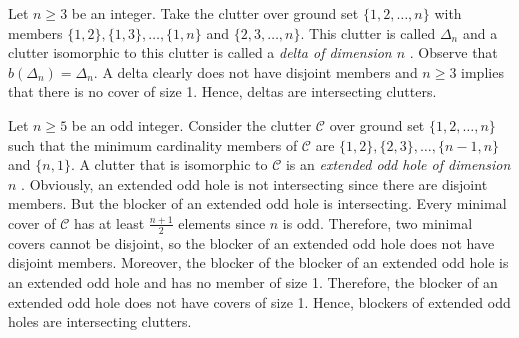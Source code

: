 \documentclass[a4paper, 12pt]{scrbook}
\theoremstyle{definition}
\begin{document}
            \begin{figure}[b]
                \centering
        \end{figure}



        Let $n \geq 3$ be an integer.
        Take the clutter over ground set $\{1,2,\ldots,n\}$ with members $\{1,2\},\{1,3\},\ldots,\{1,n\}$ and $\{2,3,\ldots,n\}$.
        This clutter is called $\Delta_n$ and a clutter isomorphic to this clutter is called a \emph{delta of dimension $n$} \cite{deltadefinition}.
        Observe that $b(\Delta_n)=\Delta_n$.
        A delta clearly does not have disjoint members and $n\geq 3$ implies that there is no cover of size 1.
        Hence, deltas are intersecting clutters.

        Let $n\geq 5$ be an odd integer.
        Consider the clutter $\mathcal{C}$ over ground set $\{1,2,\ldots,n\}$ such that the minimum cardinality members of $\mathcal{C}$ are $\{1,2\},\{2,3\},\ldots,\{n-1,n\}$ and $\{n,1\}$.
        A clutter that is isomorphic to $\mathcal{C}$ is an \emph{extended odd hole of dimension $n$} \cite{deltas}.
        Obviously, an extended odd hole is not intersecting since there are disjoint members.
        But the blocker of an extended odd hole is intersecting.
        Every minimal cover of $\mathcal{C}$ has at least $\frac{n+1}2$ elements since $n$ is odd.
        Therefore, two minimal covers cannot be disjoint, so the blocker of an extended odd hole does not have disjoint members.
        Moreover, the blocker of the blocker of an extended odd hole is an extended odd hole and has no member of size 1.
        Therefore, the blocker of an extended odd hole does not have covers of size 1.
        Hence, blockers of extended odd holes are intersecting clutters.
\end{document}
